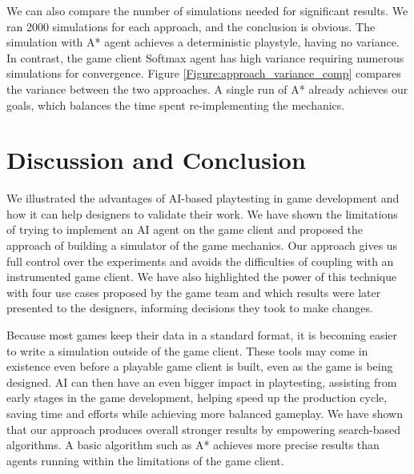 \documentclass[letterpaper]{article} %
\begin{document}
We can also compare the number of simulations needed for significant results. We ran 2000 simulations for each approach, and the conclusion is obvious. The simulation with A* agent achieves a deterministic playstyle, having no variance. In contrast, the game client Softmax agent has high variance requiring numerous simulations for convergence. Figure \ref{Figure:approach_variance_comp} compares the variance between the two approaches. A single run of A* already achieves our goals, which balances the time spent re-implementing the mechanics.

\vspace{-0.93mm}
\vspace{-1.54mm}
\section{Discussion and Conclusion}

We illustrated the advantages of AI-based playtesting in game development and how it can help designers to validate their work. We have shown the limitations of trying to implement an AI agent on the game client and proposed the approach of building a simulator of the game mechanics. Our approach gives us full control over the experiments and avoids the difficulties of coupling with an instrumented game client. We have also highlighted the power of this technique with four use cases proposed by the game team and which results were later presented to the designers, informing decisions they took to make changes.

Because most games keep their data in a standard format, it is becoming easier to write a simulation outside of the game client. These tools may come in existence even before a playable game client is built, even as the game is being designed. AI can then have an even bigger impact in playtesting, assisting from early stages in the game development, helping speed up the production cycle, saving time and efforts while achieving more balanced gameplay.  We have shown that our approach produces overall stronger results by empowering search-based algorithms. A basic algorithm such as A* achieves more precise results than agents running within the limitations of the game client.
\end{document}
